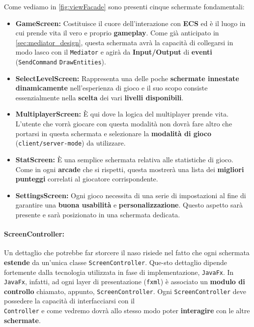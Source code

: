 Come vediamo in \ref{fig:viewFacade} sono presenti cinque schermate fondamentali:
\begin{itemize}
	\item{\textbf{GameScreen:}}
	Costituisce il cuore dell'interazione con \textbf{ECS} ed è il luogo in cui prende vita il vero e proprio \textbf{gameplay}. Come già anticipato in \ref{sec:mediator_design}, questa schermata avrà la capacità di collegarsi in modo lasco con il \texttt{Mediator} e agirà da \textbf{Input/Output} di \textbf{eventi} (\texttt{SendCommand} \texttt{DrawEntities}).
	\item{\textbf{SelectLevelScreen:}}
	Rappresenta una delle poche \textbf{schermate innestate dinamicamente} nell'esperienza di gioco e il suo scopo consiste essenzialmente nella \textbf{scelta} dei vari \textbf{livelli disponibili}. 
	\item{\textbf{MultiplayerScreen:}}
	È qui dove la logica del multiplayer prende vita. L'utente che vorrà giocare con questa modalità non dovrà fare altro che portarsi in questa schermata e selezionare la \textbf{modalità di gioco} \\ (\texttt{client/server-mode}) da utilizzare.
	\item{\textbf{StatScreen:}}
	È una semplice schermata relativa alle statistiche di gioco. Come in ogni \textbf{arcade} che si rispetti, questa mostrerà una lista dei \textbf{migliori punteggi} correlati al giocatore corrispondente.
	\item{\textbf{SettingsScreen:}}
	Ogni gioco necessita di una serie di impostazioni al fine di garantire una \textbf{buona usabilità} e \textbf{personalizzazione}. Questo aspetto sarà presente e sarà posizionato in una schermata dedicata. 
\end{itemize}

\paragraph{ScreenController:}
Un dettaglio che potrebbe far storcere il naso risiede nel fatto che ogni schermata \textbf{estende} da un'unica classe \texttt{ScreenController}. Que-sto dettaglio dipende fortemente dalla tecnologia utilizzata in fase di implementazione, \texttt{JavaFx}. In \texttt{JavaFx}, infatti, ad ogni layer di presentazione (\texttt{fxml}) è associato un \textbf{modulo di controllo} chiamato, appunto, \texttt{ScreenController}. Ogni \texttt{ScreenController} deve possedere la capacità di interfacciarsi con il \\ \texttt{Controller} e come vedremo dovrà allo stesso modo poter \textbf{interagire} con le altre \textbf{schermate}.

